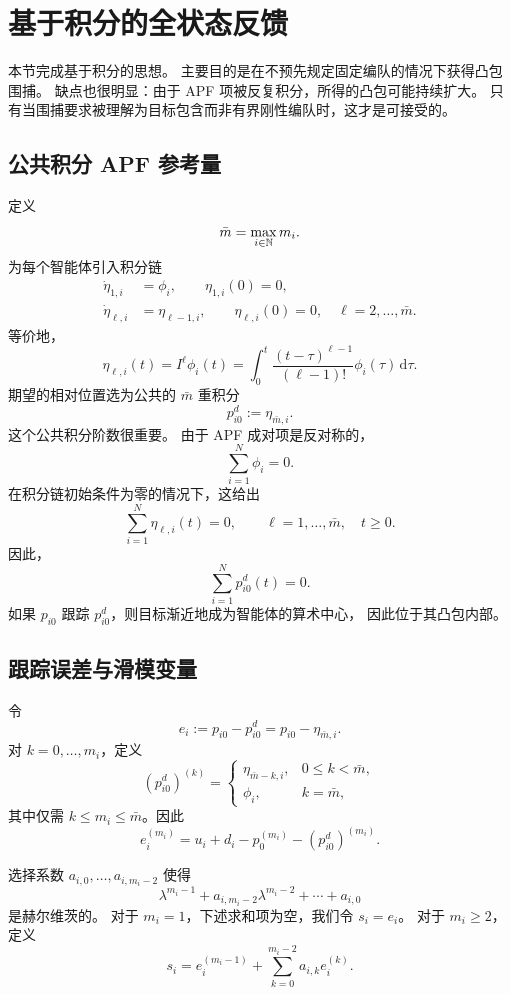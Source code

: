 \section{基于积分的全状态反馈}

本节完成基于积分的思想。
主要目的是在不预先规定固定编队的情况下获得凸包围捕。
缺点也很明显：由于 APF 项被反复积分，所得的凸包可能持续扩大。
只有当围捕要求被理解为目标包含而非有界刚性编队时，这才是可接受的。

\subsection{公共积分 APF 参考量}

定义
\[
    \bar m=\max_{i\in\mathbb{N}}m_i.
\]
为每个智能体引入积分链
\begin{align}
    \dot\eta_{1,i}&=\phi_i,\qquad \eta_{1,i}(0)=0,\\
    \dot\eta_{\ell,i}&=\eta_{\ell-1,i},\qquad
    \eta_{\ell,i}(0)=0,\quad \ell=2,\dots,\bar m.
\end{align}
等价地，
\[
    \eta_{\ell,i}(t)=I^\ell\phi_i(t)
    =\int_0^t\frac{(t-\tau)^{\ell-1}}{(\ell-1)!}\phi_i(\tau)\,\mathrm d\tau .
\]
期望的相对位置选为公共的 $\bar m$ 重积分
\[
    p_{i0}^{d}:=\eta_{\bar m,i}.
\]
这个公共积分阶数很重要。
由于 APF 成对项是反对称的，
\[
    \sum_{i=1}^{N}\phi_i=0.
\]
在积分链初始条件为零的情况下，这给出
\[
    \sum_{i=1}^{N}\eta_{\ell,i}(t)=0,\qquad
    \ell=1,\dots,\bar m,\quad t\ge0.
\]
因此，
\[
    \sum_{i=1}^{N}p_{i0}^{d}(t)=0.
\]
如果 $p_{i0}$ 跟踪 $p_{i0}^d$，则目标渐近地成为智能体的算术中心，
因此位于其凸包内部。

\subsection{跟踪误差与滑模变量}

令
\[
    e_i:=p_{i0}-p_{i0}^{d}
        =p_{i0}-\eta_{\bar m,i}.
\]
对 $k=0,\dots,m_i$，定义
\[
    (p_{i0}^{d})^{(k)}
    =
    \begin{cases}
        \eta_{\bar m-k,i}, & 0\le k<\bar m,\\
        \phi_i, & k=\bar m,
    \end{cases}
\]
其中仅需 $k\le m_i\le\bar m$。因此
\[
    e_i^{(m_i)}
    =u_i+d_i-p_0^{(m_i)}-(p_{i0}^{d})^{(m_i)}.
\]

选择系数 $a_{i,0},\dots,a_{i,m_i-2}$ 使得
\[
    \lambda^{m_i-1}
    +a_{i,m_i-2}\lambda^{m_i-2}
    +\cdots+a_{i,0}
\]
是赫尔维茨的。
对于 $m_i=1$，下述求和项为空，我们令 $s_i=e_i$。
对于 $m_i\ge2$，定义
\[
    s_i=e_i^{(m_i-1)}
    +\sum_{k=0}^{m_i-2}a_{i,k}e_i^{(k)}.
\]

